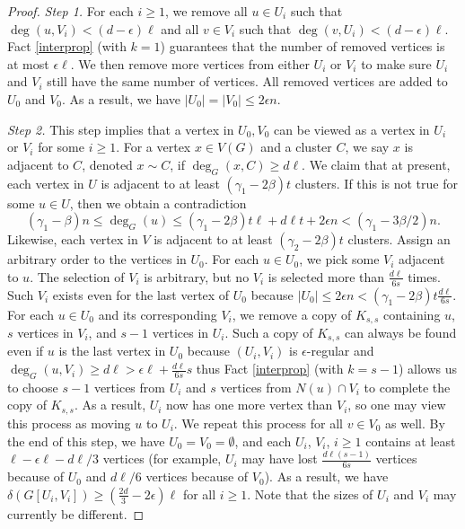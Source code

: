 \documentclass[oneside,12pt]{memoir}
\newcommand{\ep}{\epsilon}
\begin{document}
\begin{proof}
\emph{Step 1.} For each $i \geq 1$, we remove all $u\in U_i$ such that $\deg(u, V_i) < (d-\ep)\ell$ and all
$v\in V_i$ such that $\deg(v, U_i) < (d-\ep)\ell$. Fact \ref{interprop} (with $k=1$) guarantees that the
number of removed vertices is at most $\ep\ell$. We then remove more vertices from either $U_i$
or $V_i$ to make sure $U_i$ and $V_i$ still have the same number of vertices. All removed vertices
are added to $U_0$ and $V_0$. As a result, we have $|U_0|=|V_0|\leq 2\ep n$.

\emph{Step 2.} This step implies that a vertex in $U_0, V_0$ can be viewed as a vertex in $U_i$ or $V_i$ for
some $i\geq 1$. For a vertex $x \in V(G)$ and a cluster $C$, we say $x$ is adjacent to $C$, denoted $x \sim C$, if
$\deg_G(x,C)\geq d\ell$. We claim that at present, each vertex in $U$ is adjacent to at least
$(\gamma_1-2\beta)t$ clusters.  If this is not true for some $u \in U$, then we obtain a contradiction
$$(\gamma_1-\beta)n\leq \deg_G(u)\leq (\gamma_1-2\beta)t\ell+d\ell t +2\ep n<(\gamma_1-3\beta/2)n.$$
Likewise, each vertex in $V$ is adjacent to at least $(\gamma_2-2\beta)t$ clusters.  Assign an arbitrary order to the vertices in $U_0$. For each $u \in U_0$, we pick some $V_i$ adjacent
to $u$. The selection of $V_i$ is arbitrary, but no $V_i$ is selected more than $\frac{d\ell}{6s}$ times. Such $V_i$
exists even for the last vertex of $U_0$ because $|U_0|\leq 2\ep n<(\gamma_1-2\beta)t\frac{d\ell}{6s}$. For each $u\in U_0$
and its corresponding $V_i$, we remove a copy of $K_{s,s}$ containing $u$, $s$ vertices in $V_i$, and $s-1$ vertices
in $U_i$. Such a copy of $K_{s,s}$ can always be found even if $u$ is the last vertex in $U_0$
because $(U_i, V_i)$ is $\ep$-regular and $\deg_G(u, V_i)\geq d\ell>\ep\ell+\frac{d\ell}{6s}s$ thus Fact \ref{interprop} (with $k=s-1$) allows us to choose $s-1$ vertices from $U_i$ and $s$ vertices from $N(u)\cap V_i$ to complete the copy of $K_{s,s}$. As a result, $U_i$ now has
one more vertex than $V_i$, so one may view this process as moving $u$ to $U_i$. We repeat this
process for all $v \in V_0$ as well. By the end of this step, we have $U_0=V_0=\emptyset$, and each
$U_i$, $V_i$, $i \geq 1$ contains at least $\ell -\ep\ell-d\ell/3$ vertices (for example, $U_i$ may have lost $\frac{d\ell(s-1)}{6s}$
vertices because of $U_0$ and $d\ell/6$ vertices because of $V_0$).  As a result, we have $\delta(G[U_i, V_i])\geq (\frac{2d}{3}-2\ep)\ell$ for all $i\geq 1$. Note that the sizes of $U_i$ and $V_i$ may currently be different.


\end{proof}
\end{document}
